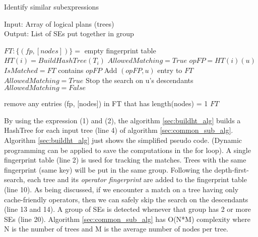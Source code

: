 \begin{algorithm}
\caption{Identify similar subexpressions}\label{sec:common_sub_alg}
Input: Array of logical plans (trees)\\
Output: List of SEs put together in group
\begin{algorithmic}[1]
\State $FT:\{(fp, [nodes])\} =$ empty fingerprint table
	\State$HT(i) = BuildHashTree(T_{i})$
	\State $AllowedMatching = True$	
		\State $opFP = HT(i)(u)$
		\State $IsMatched = FT$ contains $opFP$
				\State Add $(opFP, u)$ entry to $FT$
		\EndIf
		\State $AllowedMatching = True$	
			\State Stop the search on u's descendants
			\State $AllowedMatching = False$	
		\EndIf		
	\EndFor
	
\EndFor
\State remove any entries (fp, [nodes]) in FT that has length(nodes) = 1
\State \Return  $FT$
\EndProcedure
\end{algorithmic}
\end{algorithm}

By using the expression (1) and (2), the algorithm \ref{sec:buildht_alg} builds a HashTree for each input tree (line 4) of algorithm \ref{sec:common_sub_alg}. Algorithm \ref{sec:buildht_alg} just shows the simplified pseudo code. (Dynamic programming can be applied to save the computations in the for loop). A single fingerprint table (line 2) is used for tracking the matches. Trees with the same fingerprint (same key) will be put in the same group. Following the depth-first-search, each tree and its \emph{operator fingerprint} are added to the fingerprint table (line 10). As being discussed, if we encounter a match on a tree having only cache-friendly operators, then we can safely skip the search on the descendants (line 13 and 14). A group of SEs is detected whenever that group has 2 or more SEs (line 20). Algorithm \ref{sec:common_sub_alg} has O(N*M) complexity where N is the number of trees and M is the average number of nodes per tree.